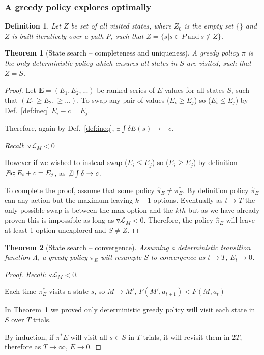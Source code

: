 \documentclass[9pt,twocolumn,twoside]{pnas-new}
\newtheorem{theorem}{Theorem}
\newtheorem{definition}{Definition}
\begin{document}
\subsubsection*{A greedy policy explores optimally}


\begin{definition}
    Let $Z$ be set of all visited states, where $Z_0$ is the empty set $\{\}$ and $Z$ is built iteratively over a path $P$, such that $Z = \{s | s \in P\ \text{and}\ s \not\in Z\}$.    
\end{definition}

\begin{theorem}[State search -- completeness and uniqueness] \label{theorem:Z}
A greedy policy $\pi$ is the only deterministic policy which ensures all states in $S$ are visited, such that $Z = S$.
\end{theorem}
\begin{proof}    
    Let $\mathbf{E} = (E_1, E_2, ...)$ be ranked series of $E$ values for all states $S$, such that $(E_1 \geq E_2, \geq ...)$. To swap any pair of values ($E_i \geq E_j$) so ($E_i \leq E_j$) by Def.~\ref{def:ineq} $E_i - c = E_j$.  

    Therefore, again by Def.~\ref{def:ineq}, $\exists \int \delta E(s) \rightarrow -c$. 

    \textit{Recall}: $\triangledown \mathcal{L}_M < 0$

    However if we wished to instead swap ($E_i \leq E_j$) so ($E_i \geq E_j$) by definition $\not \exists c; E_i + c = E_j$, as $\not \exists \int \delta \rightarrow c$. 

    To complete the proof, assume that some policy $\hat \pi_E \neq \pi^*_E$. By definition policy $\hat \pi_E$ can any action but the maximum leaving $k-1$ options. Eventually as $t \rightarrow T$ the only possible swap is between the max option and the $kth$ but as we have already proven this is impossible as long as $\triangledown \mathcal{L}_M < 0$. Therefore, the policy $\hat \pi_E$ will leave at least 1 option unexplored and $S \neq Z$.
\end{proof}

\begin{theorem}[State search -- convergence] \label{theorem:convergence}
    Assuming a deterministic transition function $\Lambda$, a greedy policy $\pi_E$ will resample $S$ to convergence as $t \rightarrow T$, $E_t \rightarrow 0$.
\end{theorem}
\begin{proof}
    \textit{Recall}: $\triangledown \mathcal{L}_M < 0$. 

    Each time $\pi^*_E$ visits a state $s$, so $M \rightarrow M'$, $F(M', a_{t+1}) < F(M, a_t)$

    In Theorem~\ref{theorem:Z} we proved only deterministic greedy policy will visit each state in $S$ over $T$ trials.
    
    By induction, if $\pi^*E$ will visit all $s \in S$ in $T$ trials, it will revisit them in $2T$, therefore as $T \rightarrow \infty$, $E \rightarrow 0$. 
\end{proof}
\end{document}
